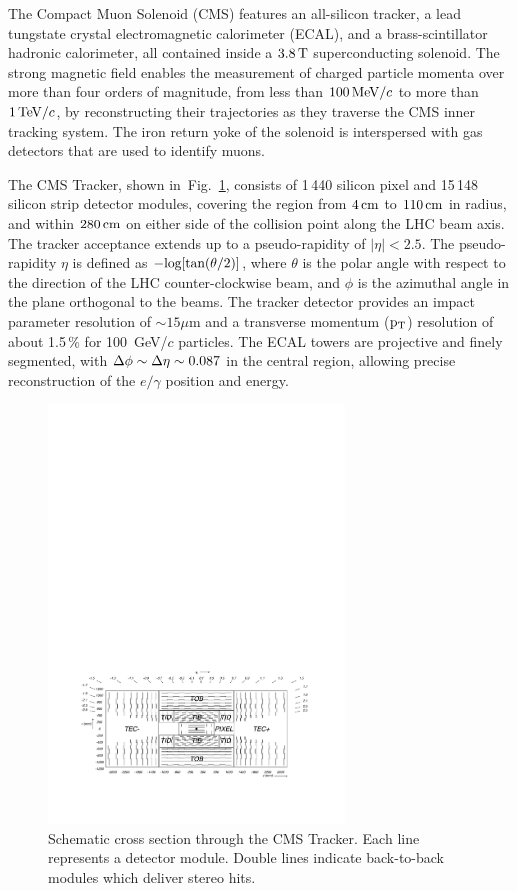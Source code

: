 \documentclass[a4paper]{jpconf}
\begin{document}
The Compact Muon Solenoid (CMS) features an all-silicon tracker, a lead tungstate crystal electromagnetic calorimeter (ECAL), and a brass-scintillator hadronic calorimeter, all contained inside a  $3.8\,{\rm T}$  superconducting solenoid.
The strong magnetic field  enables the measurement of charged
particle momenta over more than four orders of magnitude, from less than
$100{\rm \, MeV}/c$ to more than $1{\rm \, TeV}/c$, by reconstructing their trajectories as they
traverse the CMS inner tracking system.  
The iron return yoke of the solenoid is interspersed with gas detectors that are used to identify muons.


The CMS Tracker, shown
in~Fig.~\ref{fig:tklayout}, consists of 1\,440 silicon pixel and 15\,148 silicon strip detector modules, covering
the region from $4\rm \, cm$ to $110\rm \, cm$ in radius, and within $280\rm \, cm$ on either
side of the collision point along the LHC beam axis. The tracker
acceptance extends up to a pseudo-rapidity of $\left | \eta \right | < 2.5$.
The pseudo-rapidity $\eta$ is defined as $\rm  -log[tan(\theta/2)]$, where $\theta$ is the polar angle with respect to the direction of the LHC counter-clockwise beam, and $\phi$ is the azimuthal angle in the plane orthogonal to the beams.
The tracker detector  provides an impact parameter resolution of $\sim 15 \mu$m and a transverse momentum ($\rm p_{T}$) resolution of about 1.5\,\% for 100~GeV/$c$ particles.
The ECAL towers are projective and finely segmented, with $\rm \Delta\phi \sim \Delta\eta \sim 0.087$ in the central region, allowing precise reconstruction of the $e/\gamma$ position and energy.  

\begin{figure}[h!]
  \begin{center}
    \includegraphics[width=0.7\textwidth]{fig/general_layout.pdf}
    \caption{Schematic cross section through the CMS Tracker. Each line represents a detector module. Double lines indicate back-to-back modules which deliver stereo hits.}
    \label{fig:tklayout}
  \end{center}
\end{figure}
\end{document}
